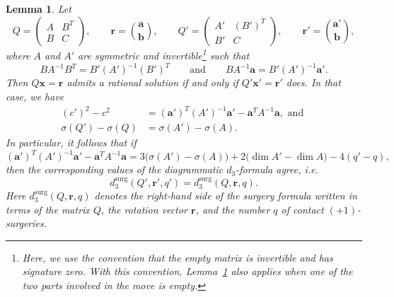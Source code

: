 \documentclass[10pt,a4paper]{amsart}
\newtheorem{lemma}{Lemma}
\begin{document}
\begin{lemma}\label{lem:Schur_local}
Let
\[
Q=\begin{pmatrix} A & B^T \\ B & C \end{pmatrix},
\qquad
\boldsymbol r=\binom{\boldsymbol a}{\boldsymbol b},
\qquad
Q'=\begin{pmatrix} A' & (B')^T \\ B' & C \end{pmatrix},
\qquad
\boldsymbol r'=\binom{\boldsymbol a'}{\boldsymbol b},
\]
where \(A\) and \(A'\) are symmetric and invertible\footnote{Here, we use the convention that the empty matrix is invertible and has signature zero. With this convention, Lemma~\ref{lem:Schur_local} also applies when one of the two parts involved in the move is empty.} such that
\[
B A^{-1} B^T = B'(A')^{-1}(B')^T
\qquad\text{and}\qquad
B A^{-1}\boldsymbol a = B'(A')^{-1}\boldsymbol a'.
\]
Then \(Q\boldsymbol x=\boldsymbol r\) admits a rational solution if and only if \(Q'\boldsymbol x'=\boldsymbol r'\) does. In that case, we have
\begin{align*}
    (c')^2-c^2 &= (\boldsymbol a')^T(A')^{-1}\boldsymbol a' - \boldsymbol a^TA^{-1}\boldsymbol a, \textrm{ and }\\
\sigma(Q')-\sigma(Q) &=\sigma(A')-\sigma(A).
\end{align*}
In particular, it follows that if
\[
(\boldsymbol a')^T(A')^{-1}\boldsymbol a'
-
\boldsymbol a^TA^{-1}\boldsymbol a
=
3\bigl(\sigma(A')-\sigma(A)\bigr)
+
2\bigl(\operatorname{dim} A'-\operatorname{dim} A\bigr)
-
4(q'-q),
\]
then the corresponding values of the diagrammatic \(d_3\)-formula agree, i.e.\
\[
d_3^{\mathrm{surg}}(Q',\boldsymbol r',q')
=
d_3^{\mathrm{surg}}(Q,\boldsymbol r,q).
\]
Here \(d_3^{\mathrm{surg}}(Q,\boldsymbol r,q)\) denotes the right-hand side of the surgery formula written in terms of the matrix \(Q\), the rotation vector \(\boldsymbol r\), and the number \(q\) of contact \((+1)\)-surgeries.
\end{lemma}
\end{document}
